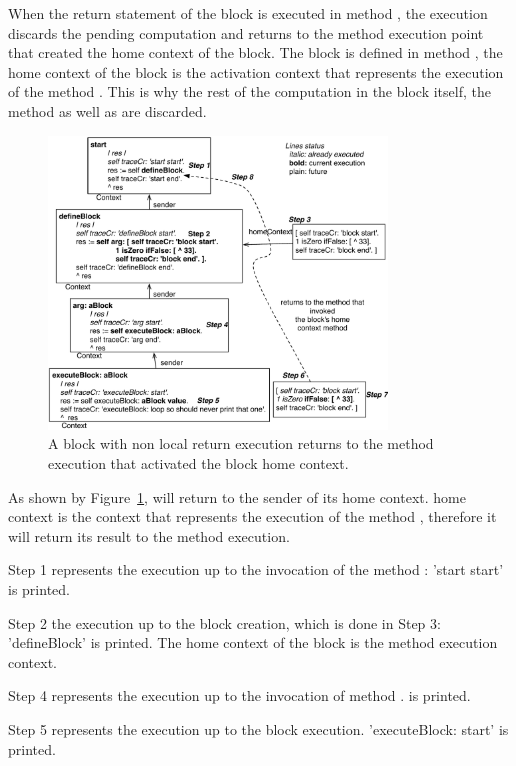 \documentclass[a4paper,10pt,twoside]{book}
\begin{document}
When the return statement of the block is executed in method , the execution discards the pending computation and returns to the method execution point that created the home context of the block. The block is defined in  method , the home context of the block is the activation context that represents the execution of the method . This is why the rest of the computation in the block itself, the  method as well as  are discarded.

\begin{figure}[!h]
\begin{center}\includegraphics[width=9cm]{nonLocalReturn2}
\caption{A block with non local return execution returns to the method execution that activated the block home context.\label{nonLocalReturn}}
\end{center}
\end{figure}

As shown by Figure~\ref{nonLocalReturn}, \ct{[^33]} will return to the sender of its home context. \ct{[^33]} home context is the context that represents the execution of the method , therefore it will return its result to the method  execution.

Step 1 represents the execution up to the invocation of the method : 'start start' is printed.

Step 2 the execution up to the block creation, which is done in Step 3: 'defineBlock' is printed. The home context of the block is the  method execution context.

Step 4 represents the execution up to the invocation of method .  is printed.

Step 5 represents the execution up to the block execution. 'executeBlock: start' is printed.
\end{document}
